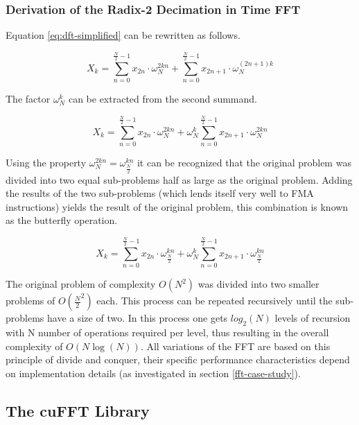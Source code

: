 \documentclass[english,11pt,a4paper,table]{article} %
\begin{document}
\subsubsection{Derivation of the Radix-2 Decimation in Time FFT}

Equation \ref{eq:dft-simplified} can be rewritten as follows.

\begin{equation}
	\label{eq:dft-simplified-2}
	X_k = \sum_{n=0}^{\frac{N}{2}-1} x_{2n} \cdot \omega_{N}^{2kn} + \sum_{n=0}^{\frac{N}{2}-1} x_{2n+1} \cdot \omega_{N}^{(2n+1)k}
\end{equation}

The factor $\omega_N^k$ can be extracted from the second summand.

\begin{equation}
	\label{eq:dft-simplified-3}
	X_k = \sum_{n=0}^{\frac{N}{2}-1} x_{2n} \cdot \omega_{N}^{2kn} + \omega_N^k \sum_{n=0}^{\frac{N}{2}-1} x_{2n+1} \cdot \omega_{N}^{2kn}
\end{equation}

Using the property $\omega_N^{2kn} = \omega_{\frac{N}{2}}^{kn}$ it can be recognized that the original problem was divided into two equal sub-problems half as large as the original problem.
Adding the results of the two sub-problems (which lends itself very well to FMA instructions) yields the result of the original problem, this combination is known as the butterfly operation.

\begin{equation}
	\label{eq:dft-simplified-4}
	X_k = \sum_{n=0}^{\frac{N}{2}-1} x_{2n} \cdot \omega_{\frac{N}{2}}^{kn} + \omega_N^k \sum_{n=0}^{\frac{N}{2}-1} x_{2n+1} \cdot \omega_{\frac{N}{2}}^{kn}
\end{equation}

The original problem of complexity $O(N^2)$ was divided into two smaller problems of $O(\frac{N}{2}^2)$ each.
This process can be repeated recursively until the sub-problems have a size of two.
In this process one gets $log_2(N)$ levels of recursion with N number of operations required per level, thus resulting in the overall complexity of $O(N \log(N))$.
All variations of the FFT are based on this principle of divide and conquer, their specific performance characteristics depend on implementation details (as investigated in section \ref{fft-case-study}).

\subsection{The cuFFT Library}
\label{cufft_section}
\end{document}
